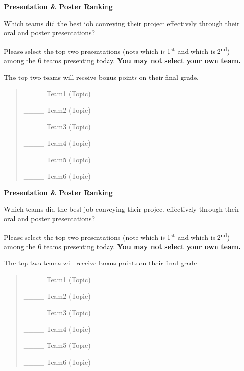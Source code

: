\documentclass[]{article}
\date{}
\begin{document}
\protect\hypertarget{__DdeLink__2111_916149170}{}{}\textbf{Presentation
\& Poster Ranking}

Which teams did the best job conveying their project effectively through
their oral and poster presentations?

Please select the top two presentations (note which is
1\textsuperscript{st} and which is 2\textsuperscript{nd}) among the 6
teams presenting today. \textbf{You may not select your own team.}

The top two teams will receive bonus points on their final grade.

\protect\hypertarget{__DdeLink__52_1420249783}{}{\protect\hypertarget{ddelink__52_1420249783}{}{}}

\begin{quote}
\_\_\_\_ Team1 (Topic)

\_\_\_\_ Team2 (Topic)

\_\_\_\_ Team3 (Topic)

\_\_\_\_ Team4 (Topic)

\_\_\_\_ Team5 (Topic)

\protect\hypertarget{__DdeLink__69_58259301}{}{}\_\_\_\_ Team6 (Topic)
\end{quote}

\textbf{Presentation \& Poster Ranking}

Which teams did the best job conveying their project effectively through
their oral and poster presentations?

Please select the top two presentations (note which is
1\textsuperscript{st} and which is 2\textsuperscript{nd}) among the 6
teams presenting today. \textbf{You may not select your own team.}

The top two teams will receive bonus points on their final grade.

\begin{quote}
\_\_\_\_ Team1 (Topic)

\_\_\_\_ Team2 (Topic)

\_\_\_\_ Team3 (Topic)

\_\_\_\_ Team4 (Topic)

\_\_\_\_ Team5 (Topic)

\protect\hypertarget{ddelink__2111_916149170}{}{\protect\hypertarget{__DdeLink__69_582593011}{}{}}\_\_\_\_
Team6 (Topic)
\end{quote}
\end{document}
